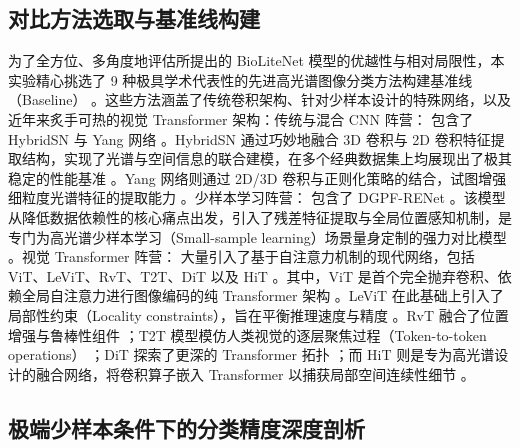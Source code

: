 \subsection{对比方法选取与基准线构建}
为了全方位、多角度地评估所提出的 BioLiteNet 模型的优越性与相对局限性，本实验精心挑选了 9 种极具学术代表性的先进高光谱图像分类方法构建基准线（Baseline） 。这些方法涵盖了传统卷积架构、针对少样本设计的特殊网络，以及近年来炙手可热的视觉 Transformer 架构：传统与混合 CNN 阵营： 包含了 HybridSN 与 Yang 网络 。HybridSN 通过巧妙地融合 3D 卷积与 2D 卷积特征提取结构，实现了光谱与空间信息的联合建模，在多个经典数据集上均展现出了极其稳定的性能基准 。Yang 网络则通过 2D/3D 卷积与正则化策略的结合，试图增强细粒度光谱特征的提取能力 。少样本学习阵营： 包含了 DGPF-RENet 。该模型从降低数据依赖性的核心痛点出发，引入了残差特征提取与全局位置感知机制，是专门为高光谱少样本学习（Small-sample learning）场景量身定制的强力对比模型 。视觉 Transformer 阵营： 大量引入了基于自注意力机制的现代网络，包括 ViT、LeViT、RvT、T2T、DiT 以及 HiT 。其中，ViT 是首个完全抛弃卷积、依赖全局自注意力进行图像编码的纯 Transformer 架构 。LeViT 在此基础上引入了局部性约束（Locality constraints），旨在平衡推理速度与精度 。RvT 融合了位置增强与鲁棒性组件 ；T2T 模型模仿人类视觉的逐层聚焦过程（Token-to-token operations） ；DiT 探索了更深的 Transformer 拓扑 ；而 HiT 则是专为高光谱设计的融合网络，将卷积算子嵌入 Transformer 以捕获局部空间连续性细节 。

\subsection{极端少样本条件下的分类精度深度剖析}

